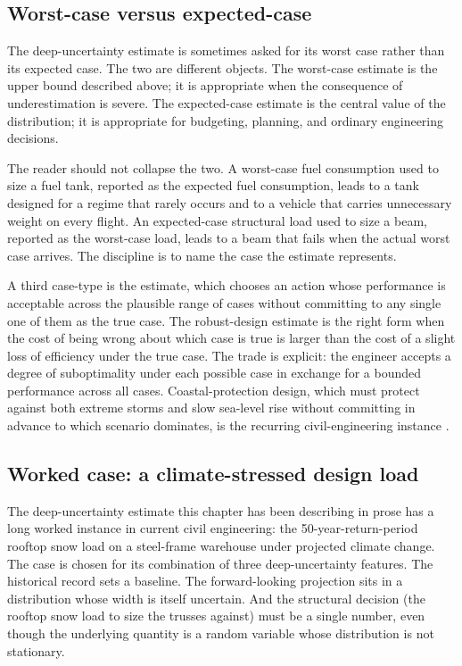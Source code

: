 \subsection{Worst-case versus expected-case}

The deep-uncertainty estimate is sometimes asked for its worst case
rather than its expected case. The two are different objects. The
worst-case estimate is the upper bound described above; it is
appropriate when the consequence of underestimation is severe. The
expected-case estimate is the central value of the distribution; it
is appropriate for budgeting, planning, and ordinary engineering
decisions.

The reader should not collapse the two. A worst-case fuel
consumption used to size a fuel tank, reported as the expected
fuel consumption, leads to a tank designed for a regime that
rarely occurs and to a vehicle that carries unnecessary weight on
every flight. An expected-case structural load used to size a
beam, reported as the worst-case load, leads to a beam that fails
when the actual worst case arrives. The discipline is to name the
case the estimate represents.

A third case-type is the  estimate, which
chooses an action whose performance is acceptable across the
plausible range of cases without committing to any single one of
them as the true case. The robust-design estimate is the right
form when the cost of being wrong about which case is true is
larger than the cost of a slight loss of efficiency under the
true case. The trade is explicit: the engineer accepts a degree
of suboptimality under each possible case in exchange for a
bounded performance across all cases. Coastal-protection design,
which must protect against both extreme storms and slow sea-level
rise without committing in advance to which scenario dominates,
is the recurring civil-engineering instance
\cite{ch09-paper:hallegatte-2009}.

\subsection{Worked case: a climate-stressed design load}

The deep-uncertainty estimate this chapter has been describing in
prose has a long worked instance in current civil engineering: the
50-year-return-period rooftop snow load on a steel-frame warehouse
under projected climate change. The case is chosen for its
combination of three deep-uncertainty features. The historical
record sets a baseline. The forward-looking projection sits in a
distribution whose width is itself uncertain. And the structural
decision (the rooftop snow load to size the trusses against) must
be a single number, even though the underlying quantity is a
random variable whose distribution is not stationary.

